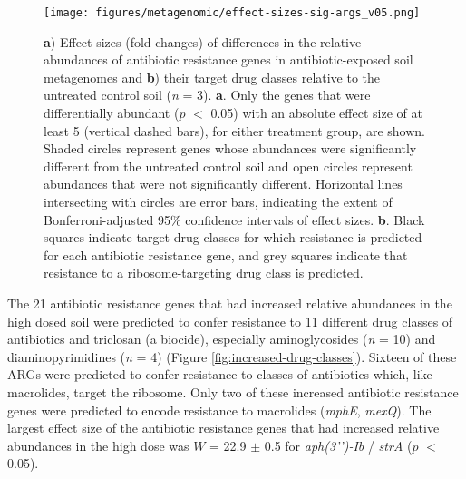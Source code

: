 \begin{figure}[htpb]
	\centering
		\texttt{[image: figures/metagenomic/effect-sizes-sig-args\_v05.png]}
	\caption[Effect sizes of differentially abundant metagenomic antibiotic resistance genes and their target drug classes.]{
		\textbf{a}) Effect sizes (fold-changes) of differences in the relative abundances of antibiotic resistance genes in antibiotic-exposed soil metagenomes and \textbf{b}) their target drug classes relative to the untreated control soil (\textit{n} = 3).
		\textbf{a}. Only the genes that were differentially abundant ($p$ $<$ 0.05) with an absolute effect size of at least 5 (vertical dashed bars), for either treatment group, are shown.
		Shaded circles represent genes whose abundances were significantly different from the untreated control soil and open circles represent abundances that were not significantly different.
		Horizontal lines intersecting with circles are error bars, indicating the extent of Bonferroni-adjusted 95\% confidence intervals of effect sizes.
		\textbf{b}. Black squares indicate target drug classes for which resistance is predicted for each antibiotic resistance gene, and grey squares indicate that resistance to a ribosome-targeting drug class is predicted.
	}
	\label{fig:effect-sizes-sig-args}
\end{figure}


The 21 antibiotic resistance genes that had increased relative abundances in the high dosed soil were predicted to confer resistance to 11 different drug classes of antibiotics and triclosan (a biocide), especially aminoglycosides (\textit{n} = 10) and diaminopyrimidines (\textit{n} = 4) (Figure \ref{fig:increased-drug-classes}).
Sixteen of these ARGs were predicted to confer resistance to classes of antibiotics which, like macrolides, target the ribosome.
Only two of these increased antibiotic resistance genes were predicted to encode resistance to macrolides (\textit{mphE}, \textit{mexQ}).
The largest effect size of the antibiotic resistance genes that had increased relative abundances in the high dose was $W$ = 22.9 $\pm$ 0.5 for \textit{aph(3’’)-Ib} / \textit{strA} ($p$ $<$ 0.05).

